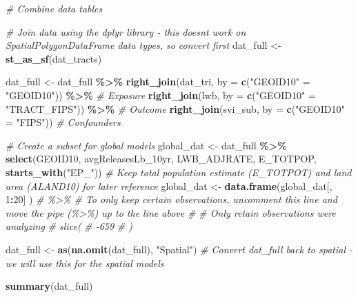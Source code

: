 \documentclass[
  12pt,
]{article}
\newenvironment{Shaded}{\begin{snugshade}}{\end{snugshade}}
\newcommand{\AttributeTok}[1]{\textcolor[rgb]{0.13,0.29,0.53}{#1}}
\newcommand{\CommentTok}[1]{\textcolor[rgb]{0.56,0.35,0.01}{\textit{#1}}}
\newcommand{\DecValTok}[1]{\textcolor[rgb]{0.00,0.00,0.81}{#1}}
\newcommand{\FunctionTok}[1]{\textcolor[rgb]{0.13,0.29,0.53}{\textbf{#1}}}
\newcommand{\NormalTok}[1]{#1}
\newcommand{\OtherTok}[1]{\textcolor[rgb]{0.56,0.35,0.01}{#1}}
\newcommand{\SpecialCharTok}[1]{\textcolor[rgb]{0.81,0.36,0.00}{\textbf{#1}}}
\newcommand{\StringTok}[1]{\textcolor[rgb]{0.31,0.60,0.02}{#1}}
\begin{document}
\begin{Shaded}
\begin{Highlighting}[]
\CommentTok{\# Combine data tables}

\CommentTok{\# Join data using the dplyr library {-} this doesn\textquotesingle{}t work on SpatialPolygonDataFrame data types, so convert first}
\NormalTok{dat\_full }\OtherTok{\textless{}{-}} \FunctionTok{st\_as\_sf}\NormalTok{(dat\_tracts)}

\NormalTok{dat\_full }\OtherTok{\textless{}{-}}\NormalTok{ dat\_full }\SpecialCharTok{\%\textgreater{}\%}
  \FunctionTok{right\_join}\NormalTok{(dat\_tri, }\AttributeTok{by =} \FunctionTok{c}\NormalTok{(}\StringTok{"GEOID10"} \OtherTok{=} \StringTok{"GEOID10"}\NormalTok{)) }\SpecialCharTok{\%\textgreater{}\%} \CommentTok{\# Exposure}
  \FunctionTok{right\_join}\NormalTok{(lwb, }\AttributeTok{by =} \FunctionTok{c}\NormalTok{(}\StringTok{"GEOID10"} \OtherTok{=} \StringTok{"TRACT\_FIPS"}\NormalTok{)) }\SpecialCharTok{\%\textgreater{}\%} \CommentTok{\# Outcome}
  \FunctionTok{right\_join}\NormalTok{(svi\_sub, }\AttributeTok{by =} \FunctionTok{c}\NormalTok{(}\StringTok{"GEOID10"} \OtherTok{=} \StringTok{"FIPS"}\NormalTok{)) }\CommentTok{\# Confounders}

\CommentTok{\# Create a subset for global models}
\NormalTok{global\_dat }\OtherTok{\textless{}{-}}\NormalTok{ dat\_full }\SpecialCharTok{\%\textgreater{}\%}
  \FunctionTok{select}\NormalTok{(GEOID10, avgReleasesLb\_10yr, LWB\_ADJRATE, E\_TOTPOP, }\FunctionTok{starts\_with}\NormalTok{(}\StringTok{"EP\_"}\NormalTok{)) }\CommentTok{\# Keep total population estimate (E\_TOTPOT) and land area (ALAND10) for later reference}
\NormalTok{global\_dat }\OtherTok{\textless{}{-}} 
  \FunctionTok{data.frame}\NormalTok{(global\_dat[, }\DecValTok{1}\SpecialCharTok{:}\DecValTok{20}\NormalTok{]}
\NormalTok{             ) }
\CommentTok{\# \%\textgreater{}\% \# To only keep certain observations, uncomment this line and move the pipe (\%\textgreater{}\%) up to the line above}
\CommentTok{\#   \# Only retain observations we\textquotesingle{}re analyzing}
\CommentTok{\#   slice(}
\CommentTok{\#     {-}659}
\CommentTok{\#   )}

\NormalTok{dat\_full }\OtherTok{\textless{}{-}} \FunctionTok{as}\NormalTok{(}\FunctionTok{na.omit}\NormalTok{(dat\_full), }\StringTok{"Spatial"}\NormalTok{) }\CommentTok{\# Convert dat\_full back to spatial {-} we will use this for the spatial models}

\FunctionTok{summary}\NormalTok{(dat\_full)}
\end{Highlighting}
\end{Shaded}
\end{document}
